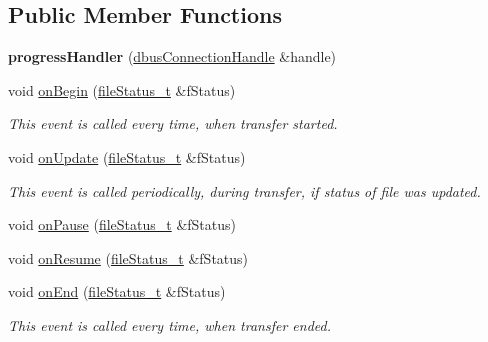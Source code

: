 \subsection*{\-Public \-Member \-Functions}
\begin{DoxyCompactItemize}
\item 
\hypertarget{classprogressHandler_a1bf09983b9e744c2765500632981b120}{{\bfseries progress\-Handler} (\hyperlink{classdbusConnectionHandle}{dbus\-Connection\-Handle} \&handle)}\label{classprogressHandler_a1bf09983b9e744c2765500632981b120}

\item 
void \hyperlink{classprogressHandler_aa3ba38afb8920b087d7f222144ad5d65}{on\-Begin} (\hyperlink{classfileStatus__t}{file\-Status\-\_\-t} \&f\-Status)
\begin{DoxyCompactList}\small\item\em \-This event is called every time, when transfer started. \end{DoxyCompactList}\item 
void \hyperlink{classprogressHandler_a1cc0ac0946febded7adf510bc08c45cf}{on\-Update} (\hyperlink{classfileStatus__t}{file\-Status\-\_\-t} \&f\-Status)
\begin{DoxyCompactList}\small\item\em \-This event is called periodically, during transfer, if status of file was updated. \end{DoxyCompactList}\item 
void \hyperlink{classprogressHandler_a125f323ccbe4292024823aa730ddf3ca}{on\-Pause} (\hyperlink{classfileStatus__t}{file\-Status\-\_\-t} \&f\-Status)
\item 
void \hyperlink{classprogressHandler_a09c83b28def90dffd42d9d7e19583348}{on\-Resume} (\hyperlink{classfileStatus__t}{file\-Status\-\_\-t} \&f\-Status)
\item 
void \hyperlink{classprogressHandler_ae9350ddb97fa047658973bbe7cee1fff}{on\-End} (\hyperlink{classfileStatus__t}{file\-Status\-\_\-t} \&f\-Status)
\begin{DoxyCompactList}\small\item\em \-This event is called every time, when transfer ended. \end{DoxyCompactList}\end{DoxyCompactItemize}


